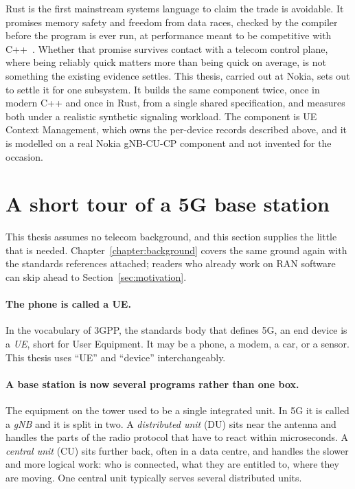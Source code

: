 \documentclass[english,twoside,openright,a4paper,censored,csm,software-track-2020]{HYthesisML}
\begin{document}
Rust is the first mainstream systems language to claim the trade is avoidable. It promises
memory safety and freedom from data races, checked by the compiler before the program is ever
run, at performance meant to be competitive with C++~\cite{klabnik2023rust,jung2018rustbelt}.
Whether that promise survives contact with a telecom control plane, where being reliably
quick matters more than being quick on average, is not something the existing evidence
settles. This thesis, carried out at Nokia, sets out to settle it for one subsystem. It
builds the same component twice, once in modern C++ and once in Rust, from a single shared
specification, and measures both under a realistic synthetic signaling workload. The
component is UE Context Management, which owns the per-device records described above, and it
is modelled on a real Nokia gNB-CU-CP component and not invented for the occasion.

\section{A short tour of a 5G base station}\label{sec:primer}
This thesis assumes no telecom background, and this section supplies the little that is
needed. Chapter~\ref{chapter:background} covers the same ground again with the standards
references attached; readers who already work on RAN software can skip ahead to
Section~\ref{sec:motivation}.

\paragraph{The phone is called a UE.}
In the vocabulary of 3GPP, the standards body that defines 5G, an end device is a \emph{UE},
short for User Equipment. It may be a phone, a modem, a car, or a sensor. This thesis uses
``UE'' and ``device'' interchangeably.

\paragraph{A base station is now several programs rather than one box.}
The equipment on the tower used to be a single integrated unit. In 5G it is called a
\emph{gNB} and it is split in two. A \emph{distributed unit} (DU) sits near the antenna and
handles the parts of the radio protocol that have to react within microseconds. A
\emph{central unit} (CU) sits further back, often in a data centre, and handles the slower and
more logical work: who is connected, what they are entitled to, where they are moving. One
central unit typically serves several distributed units.
\end{document}
